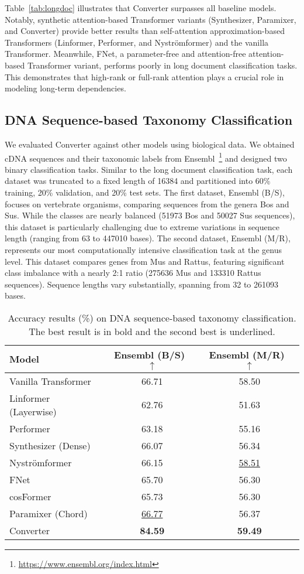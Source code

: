 Table~\ref{tab:longdoc} illustrates that Converter surpasses all baseline models. Notably, synthetic attention-based Transformer variants (Synthesizer, Paramixer, and Converter) provide better results than self-attention approximation-based Transformers (Linformer, Performer, and Nystr{\"{o}}mformer) and the vanilla Transformer. Meanwhile, FNet, a parameter-free and attention-free attention-based Transformer variant, performs poorly in long document classification tasks. This demonstrates that high-rank or full-rank attention plays a crucial role in modeling long-term dependencies.

\subsection{DNA Sequence-based Taxonomy Classification}
We evaluated Converter against other models using biological data. We obtained cDNA sequences and their taxonomic labels from Ensembl~\footnote{\href{https://www.ensembl.org/index.html}{https://www.ensembl.org/index.html}} and designed two binary classification tasks. Similar to the long document classification task, each dataset was truncated to a fixed length of 16384 and partitioned into 60\% training, 20\% validation, and 20\% test sets. The first dataset, Ensembl (B/S), focuses on vertebrate organisms, comparing sequences from the genera Bos and Sus. While the classes are nearly balanced (51973 Bos and 50027 Sus sequences), this dataset is particularly challenging due to extreme variations in sequence length (ranging from 63 to 447010 bases). The second dataset, Ensembl (M/R), represents our most computationally intensive classification task at the genus level. This dataset compares genes from Mus and Rattus, featuring significant class imbalance with a nearly 2:1 ratio (275636 Mus and 133310 Rattus sequences). Sequence lengths vary substantially, spanning from 32 to 261093 bases.

\begin{table}[!h]
\centering
\caption{Accuracy results (\%) on DNA sequence-based taxonomy classification. The best result is in bold and the second best is underlined.}
\label{tab:dna}
\begin{tabular}{l|cc}
\toprule
\textbf{Model} & \textbf{Ensembl (B/S)}~$\uparrow$ & \textbf{Ensembl (M/R)}~$\uparrow$ \\
\midrule
Vanilla Transformer & 66.71 & 58.50 \\
Linformer (Layerwise) & 62.76 & 51.63 \\
Performer & 63.18 & 55.16 \\
Synthesizer (Dense) & 66.07 & 56.34 \\
Nystr{\"{o}}mformer & 66.15 & \underline{58.51} \\
FNet & 65.70 & 56.30 \\
cosFormer & 65.73 & 56.30 \\
Paramixer (Chord) & \underline{66.77}  & 56.37 \\
\midrule
Converter & \textbf{84.59} & \textbf{59.49} \\
\bottomrule
\end{tabular}
\end{table}

